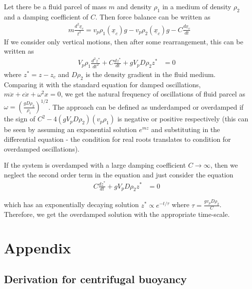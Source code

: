 \documentclass[11pt,a4paper]{article}
\newcommand{\vect}[1]{\underline{#1}}
\newcommand{\1}{\vect{1}}
\begin{document}
Let there be a fluid parcel of mass $m$ and density $\rho_1$ in a medium of density $\rho_2$ and a damping coefficient of $C$. Then force balance can be written as
\begin{align*}
& m\frac{d^2 \vect x_c}{t^2} = v_p \rho_1(\vect x_c)g - v_p \rho_2(\vect x_c)g - C\frac{d \vect x_c}{dt}
\end{align*}
If we consider only vertical motions, then after some rearrangement, this can be written as
\begin{align*}
V_p\rho_1\frac{d^2 z^*}{dt^2} + C\frac{d z^*}{dt} + g V_p D\rho_2 z^* &= 0
\end{align*}
where $z^*= z - z_c$ and $D\rho_2$ is the density gradient in the fluid medium. Comparing it with the standard equation for damped oscillations, $m\ddot{x} + c\dot{x} + \omega^2 x = 0$, we get the natural frequency of oscillations of fluid parcel as $\omega = (\frac{gD\rho_2}{\rho_1})^{1/2}$. The approach can be defined as underdamped or overdamped if the sign of $C^2-4(gV_pD\rho_2)(v_p\rho_1)$ is negative or positive respectively (this can be seen by assuming an exponential solution $e^{mz}$ and substituting in the differential equation - the condition for real roots translates to condition for overdamped oscillations).

If the system is overdamped with a large damping coefficient $C\to\infty$, then we neglect the second order term in the equation and just consider the equation
\begin{align*}
C\frac{d z^*}{dt} + g V_p D\rho_2 z^* &= 0
\end{align*}

which has an exponentially decaying solution $z^* \propto e^{-t/\tau}$ where $\tau = \frac{g v_p D\rho_2}{C}$. Therefore, we get the overdamped solution with the appropriate time-scale.

\section{Appendix}

\subsection{Derivation for centrifugal buoyancy}
\end{document}
